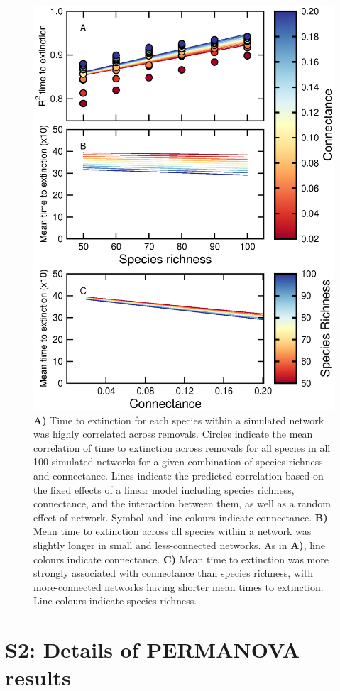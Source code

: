 \documentclass[12pt]{article}
\begin{document}
		\begin{figure}[h!]
			\caption{\textbf{A)} Time to extinction for each species within a simulated network was highly correlated across removals. Circles indicate the mean correlation of time to extinction across removals for all species in all 100 simulated networks for a given combination of species richness and connectance. Lines indicate the predicted correlation based on the fixed effects of a linear model including species richness, connectance, and the interaction between them, as well as a random effect of network. Symbol and line colours indicate connectance. \textbf{B)} Mean time to extinction across all species within a network was slightly longer in small and less-connected networks. As in \textbf{A)}, line colours indicate connectance. \textbf{C)} Mean time to extinction was more strongly associated with connectance than species richness, with more-connected networks having shorter mean times to extinction. Line colours indicate species richness.}
			\label{extorder_corrs}
			\includegraphics[width=.75\textwidth]{figures/extinction_order/extorder_correlations.eps}
			\end{figure}		


\clearpage

\section*{S2: Details of PERMANOVA results}
\end{document}
